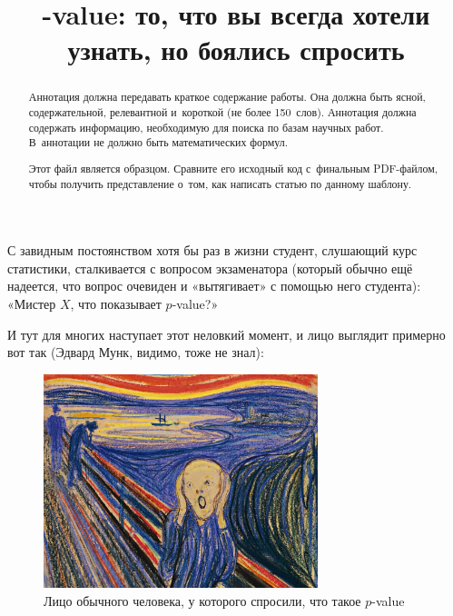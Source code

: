 \documentclass[final,pdftex]{../../template/epsilonj}
\numberwithin{equation}{section}
\begin{document}
	
	\begin{frontmatter}
		\title{-value: то, что вы всегда хотели узнать, но боялись спросить}
		
		\begin{aug}
			\author{ }
			\address{НИУ ВШЭ, Москва.}
		\end{aug}
		
		\begin{abstract}
			Аннотация должна передавать краткое содержание работы.
			Она должна быть ясной, содержательной, релевантной и~короткой
			(не более 150~слов). Аннотация должна содержать информацию,
			необходимую для поиска по базам научных работ. 
			В~аннотации не должно быть математических формул.
			
			Этот файл является образцом. Сравните его исходный код
			с~финальным PDF-файлом, чтобы получить представление о~том,
			как написать статью по данному шаблону.
		\end{abstract}
		
		\begin{keyword}
		\end{keyword}
		
	\end{frontmatter}
	


С завидным постоянством хотя бы раз в жизни студент, слушающий курс статистики, сталкивается с вопросом экзаменатора (который обычно ещё надеется, что вопрос очевиден и «вытягивает» с помощью него студента): «Мистер $X$, что показывает $p$-value?»

И тут для многих наступает этот неловкий момент, и лицо выглядит примерно вот так (Эдвард Мунк, видимо, тоже не знал):

\begin{figure}[htbp]
	\centering
	\includegraphics[width=8cm]{munk.jpg}
	\caption{Лицо обычного человека, у которого спросили, что такое $p$-value}
\end{figure}
\end{document}
